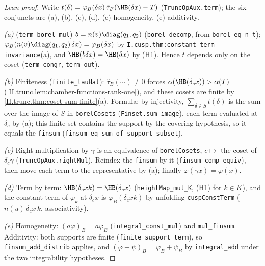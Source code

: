 \begin{proof}[Lean proof]
Write $t(\delta)=\varphi_B(\delta x)\,\hat\tau_B(\HB(\delta x)-T)$ (\texttt{TruncOpAux.term}); the six conjuncts are (a), (b), (c), (d), (e) homogeneity, (e) additivity.

\emph{(a)} (\texttt{term\_borel\_mul}) $b=n(v)\diag(q_1,q_2)$ (\texttt{borel\_decomp}, from \texttt{borel\_eq\_n\_t}); $\varphi_B(n(v)\diag(q_1,q_2)\,\delta x)=\varphi_B(\delta x)$ by \texttt{I.cusp.thm:constant-term-invariance}(a), and $\HB(b\delta x)=\HB(\delta x)$ by (H1). Hence $t$ depends only on the coset (\texttt{term\_congr}, \texttt{term\_out}).

\emph{(b)} Finiteness (\texttt{finite\_tauHat}): $\hat\tau_B(\cdots)\ne0$ forces $\alpha(\HB(\delta_cx))>\alpha(T)$ (\cref{II.trunc.lem:chamber-functions-rank-one}), and these cosets are finite by \cref{II.trunc.thm:coset-sum-finite}(a). Formula: by injectivity, $\sum_{\delta\in S}t(\delta)$ is the sum over the image of $S$ in \texttt{borelCosets} (\texttt{Finset.sum\_image}), each term evaluated at $\delta_c$ by (a); this finite set contains the support by the covering hypothesis, so it equals the \texttt{finsum} (\texttt{finsum\_eq\_sum\_of\_support\_subset}).

\emph{(c)} Right multiplication by $\gamma$ is an equivalence of \texttt{borelCosets}, $c\mapsto$ the coset of $\delta_c\gamma$ (\texttt{TruncOpAux.rightMul}). Reindex the \texttt{finsum} by it (\texttt{finsum\_comp\_equiv}), then move each term to the representative by (a); finally $\varphi(\gamma x)=\varphi(x)$.

\emph{(d)} Term by term: $\HB(\delta_cxk)=\HB(\delta_cx)$ (\texttt{heightMap\_mul\_K}, (H1) for $k\in K$), and the constant term of $\varphi_k$ at $\delta_cx$ is $\varphi_B(\delta_cxk)$ by unfolding \texttt{cuspConstTerm} ($n(u)\,\delta_cx\,k$, associativity).

\emph{(e)} Homogeneity: $(a\varphi)_B=a\varphi_B$ (\texttt{integral\_const\_mul}) and \texttt{mul\_finsum}. Additivity: both supports are finite (\texttt{finite\_support\_term}), so \texttt{finsum\_add\_distrib} applies, and $(\varphi+\psi)_B=\varphi_B+\psi_B$ by \texttt{integral\_add} under the two integrability hypotheses.
\end{proof}

